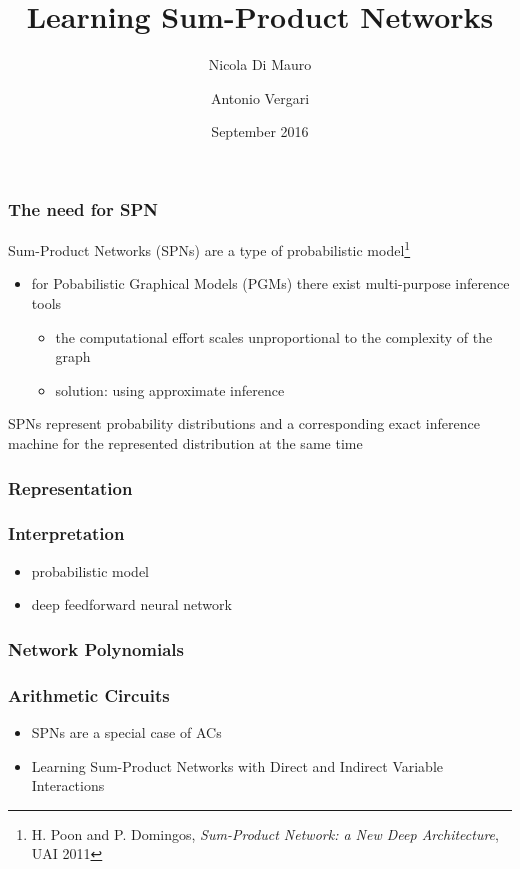 \documentclass[10pt,t]{beamer}
\title{Learning Sum-Product Networks}
\author{Nicola Di Mauro \and Antonio Vergari}
\date{September 2016}
\begin{document}
\begin{frame}
\maketitle
\end{frame}

\begin{frame}
\frametitle{The need for SPN}
Sum-Product Networks (SPNs) are a type of probabilistic model\footnote{H. Poon
  and P. Domingos, \emph{Sum-Product Network: a New Deep Architecture}, UAI 2011}
\begin{itemize}
\item for Pobabilistic Graphical Models (PGMs) there exist multi-purpose
  inference tools
\begin{itemize}
\item the computational
effort scales unproportional to the complexity of the graph
\item solution: using approximate inference
\end{itemize}
\end{itemize}
SPNs represent probability distributions and a corresponding exact inference
machine for the represented distribution at the same time 
\end{frame}

\begin{frame}
\frametitle{Representation}
\end{frame}

\begin{frame}
\frametitle{Interpretation}
\begin{itemize}
\item probabilistic model
\item deep feedforward neural network
\end{itemize}
\end{frame}

\begin{frame}
\frametitle{Network Polynomials}
\end{frame}

\begin{frame}
\frametitle{Arithmetic Circuits}
\begin{itemize}
\item SPNs are a special case of ACs
\item Learning Sum-Product Networks with Direct and Indirect Variable Interactions
\end{itemize}
\end{frame}
\end{document}
